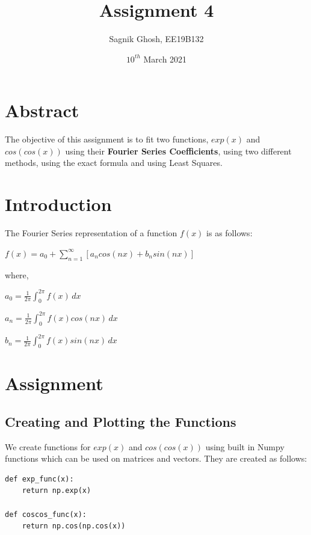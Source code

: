 \documentclass{article}
\title{Assignment 4}
\author{Sagnik Ghosh, EE19B132}
\date{$10^{th}$ March 2021}
\begin{document}
\maketitle

\section{Abstract}

The objective of this assignment is to fit two functions, $exp(x)$ and $cos(cos(x))$ using their \textbf{Fourier Series Coefficients}, using two different methods, using the exact formula and using Least Squares.

\section{Introduction}

The Fourier Series representation of a function $f(x)$ is as follows:

\begin{center}
    \large$f(x)=a_{0}+\sum_{n=1}^{\infty} [a_{n}cos(nx)+b_{n}sin(nx)]$
\end{center}
where,

\begin{center}
    \large$a_{0}=\frac{1}{2\pi} \int_{0}^{2\pi} f(x)\,dx$
\end{center}

\begin{center}
    \large$a_{n}=\frac{1}{2\pi} \int_{0}^{2\pi} f(x)cos(nx)\,dx$
\end{center}

\begin{center}
    \large$b_{n}=\frac{1}{2\pi} \int_{0}^{2\pi} f(x)sin(nx)\,dx$
\end{center}
\newpage
\section{Assignment}

\subsection{Creating and Plotting the Functions}
We create functions for $exp(x)$ and $cos(cos(x))$ using built in Numpy functions which can be used on matrices and vectors. They are created as follows:

\begin{verbatim}
def exp_func(x):
    return np.exp(x)

def coscos_func(x):
    return np.cos(np.cos(x))
\end{verbatim}
\end{document}
